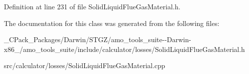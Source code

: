 Definition at line 231 of file Solid\+Liquid\+Flue\+Gas\+Material.\+h.



The documentation for this class was generated from the following files\+:\begin{DoxyCompactItemize}
\item 
\+\_\+\+C\+Pack\+\_\+\+Packages/\+Darwin/\+S\+T\+G\+Z/amo\+\_\+tools\+\_\+suite-\/-\/\+Darwin-\/x86\+\_/amo\+\_\+tools\+\_\+suite/include/calculator/losses/Solid\+Liquid\+Flue\+Gas\+Material.\+h\item 
src/calculator/losses/Solid\+Liquid\+Flue\+Gas\+Material.\+cpp\end{DoxyCompactItemize}

